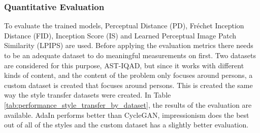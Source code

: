 \documentclass[conference]{IEEEtran}
\begin{document}
\subsubsection{Quantitative Evaluation}
To evaluate the trained models, Perceptual Distance (PD), Fréchet Inception Distance (FID), Inception Score (IS) and Learned Perceptual Image Patch Similarity (LPIPS) are used.
Before applying the evaluation metrics there needs to be an adequate dataset to do meaningful measurements on first.
Two datasets are considered for this purpose, AST-IQAD, but since it works with different kinds of content, and the content of the problem only focuses around persons, a custom dataset is created that focuses around persons.
This is created the same way the style transfer datasets were created.
In Table \ref{tab:performance_style_transfer_by_dataset}, the results of the evaluation are available.
AdaIn performs better than CycleGAN, impressionism does the best out of all of the styles and the custom dataset has a slightly better evaluation.
\end{document}
